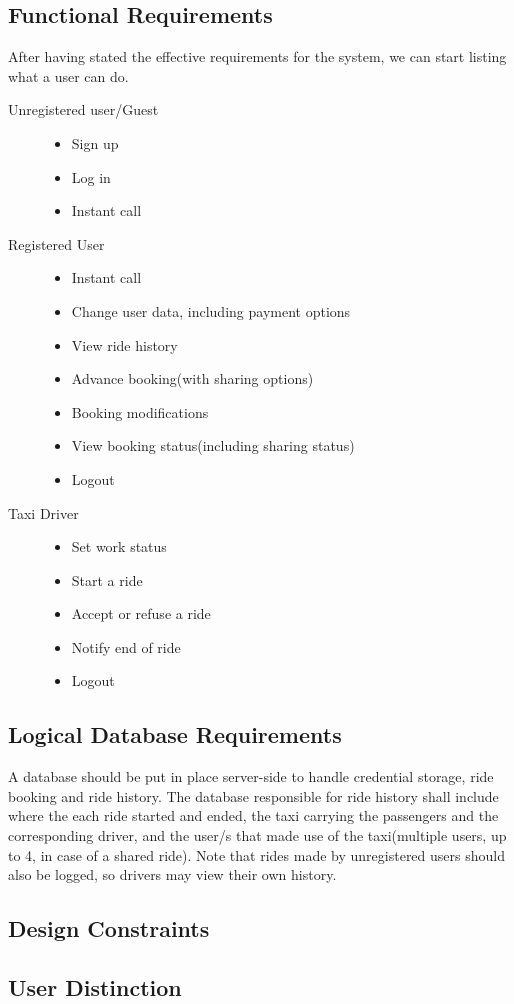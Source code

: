 \subsection{Functional Requirements}
	After having stated the effective requirements for the system, we can start listing what a user can do.
		\begin{description}
		\item[Unregistered user/Guest] \hfill
			\begin{itemize}
				\item Sign up
				\item Log in
				\item Instant call
			\end{itemize}
		\item[Registered User] \hfill
			\begin{itemize}
				\item Instant call
				\item Change user data, including payment options
				\item View ride history
				\item Advance booking(with sharing options)
				\item Booking modifications
				\item View booking status(including sharing status)
				\item Logout
			\end{itemize}
		\item[Taxi Driver] \hfill
			\begin{itemize}
				\item Set work status
				\item Start a ride
				\item Accept or refuse a ride
				\item Notify end of ride
				\item Logout
			\end{itemize}
		\end{description}
\newpage
\subsection{Logical Database Requirements}
	A database should be put in place server-side to handle credential storage, ride booking and ride history. The database responsible for ride history
	shall include where the each ride started and ended, the taxi carrying the passengers and the corresponding driver, and the user/s that made use of the
	taxi(multiple users, up to 4, in case of a shared ride). Note that rides made by unregistered users should also be logged, so drivers may view their own history.
\subsection{Design Constraints}

\subsection{User Distinction}


